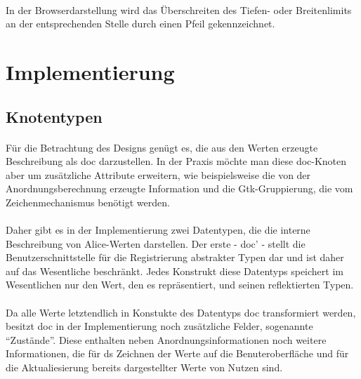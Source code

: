 \documentclass[12pt,a4paper]{article}
\begin{document}
\paragraph{}

In der Browserdarstellung wird das \"Uberschreiten des
Tiefen- oder Breitenlimits an der entsprechenden Stelle durch einen Pfeil
gekennzeichnet. 



\section{Implementierung}

\subsection{Knotentypen}

\paragraph{}

F\"ur die Betrachtung des Designs gen\"ugt es, 
die aus den Werten erzeugte Beschreibung als doc darzustellen. 
In der Praxis m\"ochte man diese doc-Knoten aber um zus\"atzliche 
Attribute erweitern, wie beispielsweise die von der 
Anordnungsberechnung erzeugte Information und die Gtk-Gruppierung,
die vom Zeichenmechanismus ben\"otigt werden. 

\paragraph{}

Daher gibt es in der Implementierung zwei Datentypen, 
die die interne Beschreibung von Alice-Werten darstellen. 
Der erste - doc' - stellt die Benutzerschnittstelle f\"ur 
die Registrierung abstrakter Typen dar und ist daher auf das 
Wesentliche beschr\"ankt. Jedes Konstrukt diese Datentyps speichert 
im Wesentlichen nur den Wert, den es repr\"asentiert, und seinen
reflektierten Typen. 

\paragraph{}

Da alle Werte letztendlich in Konstukte des Datentyps doc transformiert
werden, besitzt doc in der Implementierung noch zus\"atzliche Felder, 
sogenannte ``Zust\"ande''.
Diese enthalten neben Anordnungsinformationen noch weitere Informationen,
die f\"ur ds Zeichnen der Werte auf die Benuteroberfl\"ache und f\"ur die
Aktualiesierung bereits dargestellter Werte von Nutzen sind.
\end{document}

